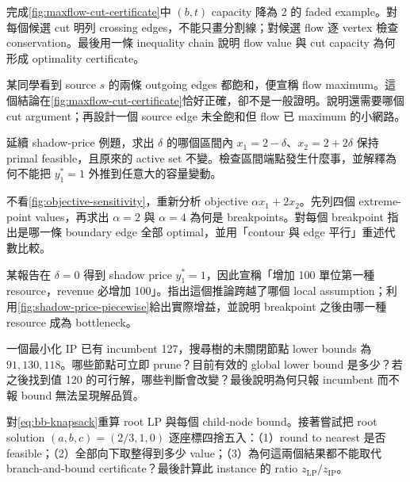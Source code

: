 \documentclass[11pt,a4paper,oneside,openany]{book}
\begin{document}
\begin{exercise}
完成\cref{fig:maxflow-cut-certificate}中 $(b,t)$ capacity 降為 2 的 faded example。對每個候選 cut 明列 crossing edges，不能只畫分割線；對候選 flow 逐 vertex 檢查 conservation。最後用一條 inequality chain 說明 flow value 與 cut capacity 為何形成 optimality certificate。
\end{exercise}
\begin{exercise}
某同學看到 source $s$ 的兩條 outgoing edges 都飽和，便宣稱 flow maximum。這個結論在\cref{fig:maxflow-cut-certificate}恰好正確，卻不是一般證明。說明還需要哪個 cut argument；再設計一個 source edge 未全飽和但 flow 已 maximum 的小網路。
\end{exercise}
\begin{exercise}
延續 shadow-price 例題，求出 $\delta$ 的哪個區間內 $x_1=2-\delta$、$x_2=2+2\delta$ 保持 primal feasible，且原來的 active set 不變。檢查區間端點發生什麼事，並解釋為何不能把 $y_1^*=1$ 外推到任意大的容量變動。
\end{exercise}
\begin{exercise}
不看\cref{fig:objective-sensitivity}，重新分析 objective $\alpha x_1+2x_2$。先列四個 extreme-point values，再求出 $\alpha=2$ 與 $\alpha=4$ 為何是 breakpoints。對每個 breakpoint 指出是哪一條 boundary edge 全部 optimal，並用「contour 與 edge 平行」重述代數比較。
\end{exercise}
\begin{exercise}
某報告在 $\delta=0$ 得到 shadow price $y_1^*=1$，因此宣稱「增加 100 單位第一種 resource，revenue 必增加 100」。指出這個推論跨越了哪個 local assumption；利用\cref{fig:shadow-price-piecewise}給出實際增益，並說明 breakpoint 之後由哪一種 resource 成為 bottleneck。
\end{exercise}
\begin{exercise}
一個最小化 IP 已有 incumbent 127，搜尋樹的未關閉節點 lower bounds 為 $91,130,118$。哪些節點可立即 prune？目前有效的 global lower bound 是多少？若之後找到值 120 的可行解，哪些判斷會改變？最後說明為何只報 incumbent 而不報 bound 無法呈現解品質。
\end{exercise}
\begin{exercise}
對\cref{eq:bb-knapsack}重算 root LP 與每個 child-node bound。接著嘗試把 root solution $(a,b,c)=(2/3,1,0)$ 逐座標四捨五入：（1）round to nearest 是否 feasible；（2）全部向下取整得到多少 value；（3）為何這兩個結果都不能取代 branch-and-bound certificate？最後計算此 instance 的 ratio $z_{\mathrm{LP}}/z_{\mathrm{IP}}$。
\end{exercise}
\end{document}
